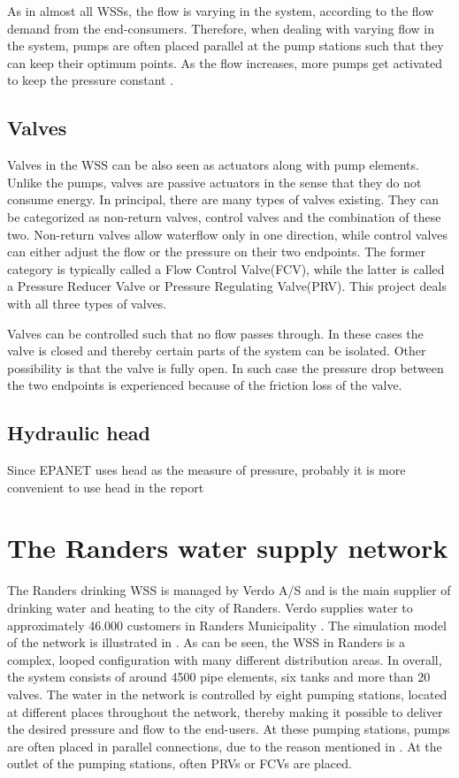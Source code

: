 As in almost all WSSs, the flow is varying in the system, according to the flow demand from the end-consumers. Therefore, when dealing with varying flow in the system, pumps are often placed parallel at the pump stations such that they can keep their optimum points. As the flow increases, more pumps get activated to keep the pressure constant \cite{kenneth_houe}. 

\subsection{Valves}
\label{valves}

Valves in the WSS can be also seen as actuators along with pump elements. Unlike the pumps, valves are passive actuators in the sense that they do not consume energy. In principal, there are many types of valves existing. They can be categorized as non-return valves, control valves and the combination of these two. Non-return valves allow waterflow only in one direction, while control valves can either adjust the flow or the pressure on their two endpoints. The former category is typically called a Flow Control Valve(FCV), while the latter is called a Pressure Reducer Valve or Pressure Regulating Valve(PRV). This project deals with all three types of valves. 

Valves can be controlled such that no flow passes through. In these cases the valve is closed and thereby certain parts of the system can be isolated. Other possibility is that the valve is fully open. In such case the pressure drop between the two endpoints is experienced because of the friction loss of the valve. 

\subsection{Hydraulic head}
\label{hydraulic_head}
Since EPANET uses head as the measure of pressure, probably it is more convenient to use head in the report

\section{The Randers water supply network}
\label{the_randers_water_supply_network}

The Randers drinking WSS is managed by Verdo A/S and is the main supplier of drinking water and heating to the city of Randers. Verdo supplies water to approximately 46.000 customers in Randers Municipality \cite{verdo}. The simulation model of the network is illustrated in . As can be seen, the WSS in Randers is a complex, looped configuration with many different distribution areas. In overall, the system consists of around 4500 pipe elements, six tanks and more than 20 valves. The water in the network is controlled by eight pumping stations, located at different places throughout the network, thereby making it possible to deliver the desired pressure and flow to the end-users. At these pumping stations, pumps are often placed in parallel connections, due to the reason mentioned in . At the outlet of the pumping stations, often PRVs or FCVs are placed. 


